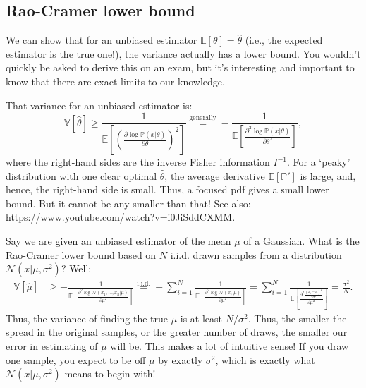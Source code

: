 \documentclass{article}
\begin{document}
\subsection{Rao-Cramer lower bound}
We can show that for an unbiased estimator $\mathbb{E}[\theta]=\hat{\theta}$ (i.e., the expected estimator is the true one!), the variance actually has a lower bound. You wouldn't quickly be asked to derive this on an exam, but it's interesting and important to know that there are exact limits to our knowledge.
\begin{spexample}
    That variance for an unbiased estimator is:
    \begin{equation}
        \mathbb{V}[\hat{\theta}] \geq \frac{1}{\mathbb{E}\left[\left(\frac{\partial \log\mathbb{P}(x|\theta)}{\partial\theta}\right)^2\right]} \stackrel{\text{generally}}{=} -\frac{1}{\mathbb{E}\left[ \frac{\partial^2\log \mathbb{P}(x|\theta)}{\partial\theta^2}   \right]},
    \end{equation}
    where the right-hand sides are the inverse Fisher information $I^{-1}$. For a `peaky' distribution with one clear optimal $\hat{\theta}$, the average derivative $\mathbb{E}[\mathbb{P}']$ is large, and, hence, the right-hand side is small. Thus, a focused pdf gives a small lower bound. But it cannot be any smaller than that! See also: \url{https://www.youtube.com/watch?v=i0JiSddCXMM}.
\end{spexample}

\begin{testexample}
    Say we are given an unbiased estimator of the mean $\mu$ of a Gaussian. What is the Rao-Cramer lower bound based on $N$ i.i.d. drawn samples from a distribution $\mathcal{N}(x|\mu,\sigma^2)$? Well:
    \begin{align}
        \mathbb{V}[\hat{\mu}] & \geq -\frac{1}{\mathbb{E}\left[ \frac{\partial^2\log \mathcal{N}(x_1,\dots,x_n|\mu)}{\partial\mu^2}   \right]} \stackrel{\text{i.i.d.}}{=}-\sum_{i=1}^N\frac{1}{\mathbb{E}\left[ \frac{\partial^2\log \mathcal{N}(x_i|\mu)}{\partial\mu^2}   \right]} = \sum_{i=1}^N\frac{1}{\mathbb{E}\left[ \frac{\partial^2 \frac{(x_i-\mu)^2}{2\sigma^2}}{\partial\mu^2}   \right]} = \frac{\sigma^2}{N}.
    \end{align}
    Thus, the variance of finding the true $\mu$ is at least $N/\sigma^2$. Thus, the smaller the spread in the original samples, or the greater number of draws, the smaller our error in estimating of $\mu$ will be. This makes a lot of intuitive sense! If you draw one sample, you expect to be off $\mu$ by exactly $\sigma^2$, which is exactly what $\mathcal{N}(x|\mu,\sigma^2)$ means to begin with!
\end{testexample}
\end{document}
